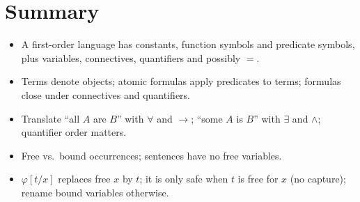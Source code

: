 \section*{Summary}
\begin{itemize}
  \item A first-order language has constants, function symbols and predicate symbols,
        plus variables, connectives, quantifiers and possibly $=$.
  \item Terms denote objects; atomic formulas apply predicates to terms; formulas close
        under connectives and quantifiers.
  \item Translate ``all $A$ are $B$'' with $\forall$ and $\to$; ``some $A$ is $B$'' with
        $\exists$ and $\land$; quantifier order matters.
  \item Free vs.\ bound occurrences; sentences have no free variables.
  \item $\varphi[t/x]$ replaces free $x$ by $t$; it is only safe when $t$ is free for $x$
        (no capture); rename bound variables otherwise.
\end{itemize}
